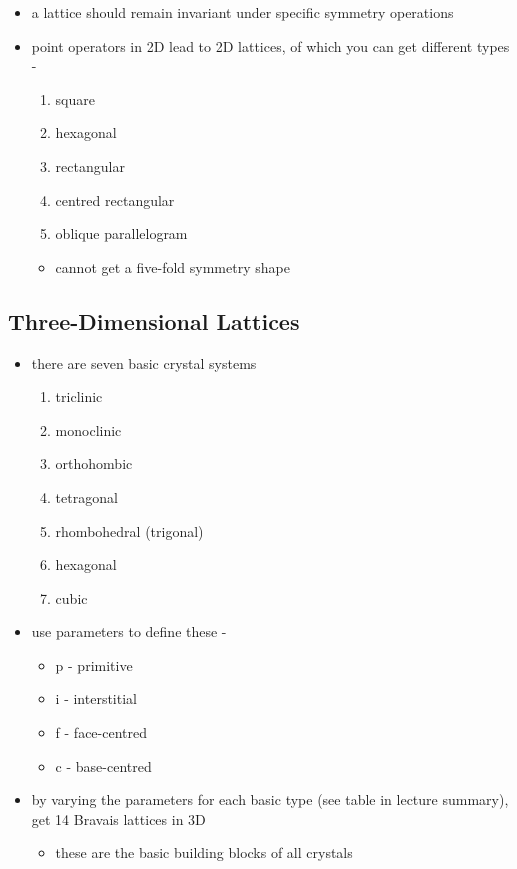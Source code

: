 \documentclass[a4paper,11pt,normalem]{article}
\begin{document}
\begin{itemize}
    \item a lattice should remain invariant under specific symmetry operations
    \item point operators in 2D lead to 2D lattices, of which you can get different types -
        \begin{enumerate}
            \item square
            \item hexagonal
            \item rectangular
            \item centred rectangular
            \item oblique parallelogram
        \end{enumerate}
        \begin{itemize}
            \item cannot get a five-fold symmetry shape
        \end{itemize}
\end{itemize}

\subsection{Three-Dimensional Lattices}

\begin{itemize}
    \item there are seven basic crystal systems
        \begin{enumerate}
            \item triclinic
            \item monoclinic
            \item orthohombic
            \item tetragonal
            \item rhombohedral (trigonal)
            \item hexagonal
            \item cubic
        \end{enumerate}
    \item use parameters to define these -
        \begin{itemize}
            \item p - primitive
            \item i - interstitial
            \item f - face-centred
            \item c - base-centred
        \end{itemize}
    \item by varying the parameters for each basic type (see table in lecture summary), get 14 Bravais lattices in 3D
        \begin{itemize}
            \item these are the basic building blocks of all crystals
        \end{itemize}
\end{itemize}
\end{document}
